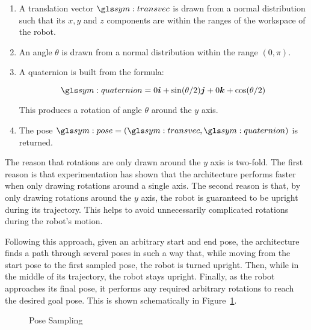 		\begin{enumerate}

			\item

				A translation vector $\transvec$ is drawn from a normal
				distribution such that its $x, y$ and $z$ components are within
				the ranges of the workspace of the robot.

			\item

				An angle $\theta$ is drawn from a normal distribution within the
				range $(0, \pi)$.

			\item

				A quaternion is built from the formula:

				\begin{equation}
					\quaternion = 0\vec{i} + \sin(\theta/2)\vec{j} + 0\vec{k} +
						\cos(\theta/2)
				\end{equation}

				This produces a rotation of angle $\theta$ around the $y$
				axis.

			\item

				The pose $\pose = (\transvec, \quaternion)$ is returned.

		\end{enumerate}

		The reason that rotations are only drawn around the $y$ axis is
		two-fold. The first reason is that experimentation has shown that the
		architecture performs faster when only drawing rotations around a single
		axis. The second reason is that, by only
		drawing rotations around the $y$ axis, the robot is guaranteed to be
		upright during its trajectory. This helps to avoid unnecessarily
		complicated rotations during the robot's motion.

		Following this approach, given an arbitrary start and end pose, the
		architecture finds a path through several poses in such a way that,
		while moving from the start pose to the first sampled pose, the robot is
		turned upright. Then, while in the middle of its trajectory, the robot
		stays upright. Finally, as the robot approaches its final pose, it
		performs any required arbitrary rotations to reach the desired goal
		pose. This is shown schematically in Figure~\ref{fig:pose_sampling}.

		\begin{figure}[hb]
			\missingfigure{}
			\caption{Pose Sampling}%
			\label{fig:pose_sampling}
		\end{figure}


